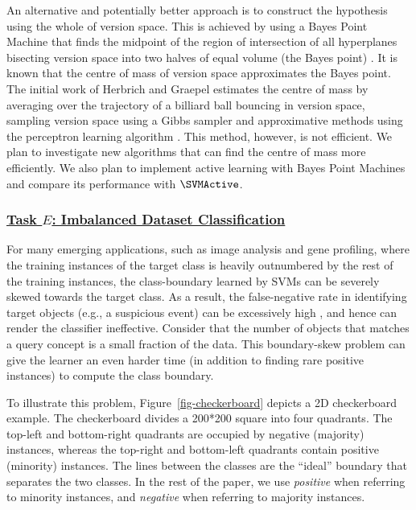 An alternative and potentially better approach is to construct the 
hypothesis using the whole of version space. This is achieved by using a 
Bayes Point Machine that finds the midpoint of the region of 
intersection of all 
hyperplanes bisecting version space into two halves of equal volume (the 
Bayes point) \cite{Herbrich+al,HG01,HGC01}. It is known that the centre of 
mass of version space 
approximates the Bayes point. The initial work of
Herbrich and Graepel estimates the centre of 
mass by averaging over the trajectory of a billiard 
ball bouncing in version space, sampling version space using a 
Gibbs sampler and approximative methods using the perceptron 
learning algorithm \cite{GH01}.
This method, however, is not efficient.
We plan to investigate new algorithms that can find the 
centre of mass more efficiently. We also plan to
implement active learning with Bayes Point Machines and
compare its performance with $\SVMActive$.


\subsubsection*{\underline{Task $E$: Imbalanced Dataset Classification}}

For many emerging applications,
such as image analysis and gene profiling, where
the training instances of the target class is
heavily outnumbered by the rest of
the training instances,
the class-boundary learned by SVMs can be
severely skewed towards the target class.  As
a result, the false-negative rate in identifying
target objects (e.g., a suspicious event)
can be excessively high
\cite{Kubat97,Japk00,Chaw00,Wei01,Nug02,Chan98,Lin02},
and hence can render the classifier ineffective.
Consider that the number of objects that matches
a query concept is a small fraction of the data.  This
boundary-skew problem can give the learner an even harder
time (in addition to finding rare positive instances)
to compute the class boundary. 

To illustrate this problem, Figure~\ref{fig-checkerboard} depicts 
a 2D checkerboard example. The checkerboard divides a 200*200 
square into four quadrants. The top-left and bottom-right 
quadrants are occupied by negative (majority)
instances, whereas the top-right and bottom-left quadrants contain
positive (minority) instances. The lines between the classes are 
the ``ideal'' boundary that separates the two classes.
In the rest of the paper, we use {\em positive} when referring to
minority instances, and {\em negative} when referring to
majority instances.

